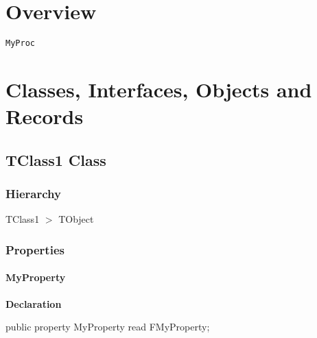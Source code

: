 \documentclass{report}
\begin{document}
\section{Overview}
\begin{description}
\item[\texttt{\begin{ttfamily}TClass1\end{ttfamily} Class}]
\item[\texttt{\begin{ttfamily}TMyRecord\end{ttfamily} Record}]
\item[\texttt{\begin{ttfamily}TMyRecord2\end{ttfamily} Record}]
\item[\texttt{\begin{ttfamily}TMyRecord3\end{ttfamily} Record}]
\end{description}
\begin{description}
\item[\texttt{MyProc}]
\end{description}
\section{Classes, Interfaces, Objects and Records}
\subsection*{TClass1 Class}
\subsubsection*{\large{\textbf{Hierarchy}}\normalsize\hspace{1ex}\hfill}
TClass1 {$>$} TObject
\subsubsection*{\large{\textbf{Properties}}\normalsize\hspace{1ex}\hfill}
\paragraph*{MyProperty}\hspace*{\fill}

\begin{list}{}{
\setlength{\itemindent}{0cm}
\setlength{\listparindent}{0cm}
\setlength{\leftmargin}{\evensidemargin}
\addtolength{\leftmargin}{\tmplength}
\settowidth{\labelsep}{X}
\addtolength{\leftmargin}{\labelsep}
\setlength{\labelwidth}{\tmplength}
}
\begin{flushleft}
\item[\textbf{Declaration}\hfill]
\begin{ttfamily}
public property MyProperty read FMyProperty;\end{ttfamily}


\end{flushleft}
\end{list}
\end{document}
